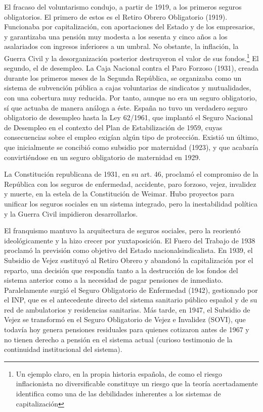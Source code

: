 \documentclass[10pt,a4paper]{article}
\begin{document}
El fracaso del voluntarismo condujo, a partir de 1919, a los primeros seguros obligatorios. El primero de estos es el Retiro Obrero Obligatorio (1919). Funcionaba por capitalización, con aportaciones del Estado y de los empresarios, y garantizaba una pensión muy modesta a los sesenta y cinco años a los asalariados con ingresos inferiores a un umbral. No obstante, la inflación, la Guerra Civil y la desorganización posterior destruyeron el valor de sus fondos.\footnote{
Un ejemplo claro, en la propia historia española, de como el riesgo inflacionista no diversificable constituye un riesgo que la teoría acertadamente identifica como una de las debilidades inherentes a los sistemas de capitalización
} El segundo, el de desempleo. La Caja Nacional contra el Paro Forzoso (1931), creada durante los primeros meses de la Segunda República, se organizaba como un sistema de subvención pública a cajas voluntarias de sindicatos y mutualidades, con una cobertura muy reducida. Por tanto, aunque no era un seguro obligatorio, sí que actuaba de manera análoga a éste. España no tuvo un verdadero seguro obligatorio de desempleo hasta la Ley 62/1961, que implantó el Seguro Nacional de Desempleo en el contexto del Plan de Estabilización de 1959, cuyas consecuencias sobre el empleo exigían algún tipo de protección. Existió un último, que inicialmente se concibió como subsidio por maternidad (1923), y que acabaría convirtiéndose en un seguro obligatorio de maternidad en 1929.

La Constitución republicana de 1931, en su art. 46, proclamó el compromiso de la República con los seguros de enfermedad, accidente, paro forzoso, vejez, invalidez y muerte, en la estela de la Constitución de Weimar. Hubo proyectos para unificar los seguros sociales en un sistema integrado, pero la inestabilidad política y la Guerra Civil impidieron desarrollarlos.

El franquismo mantuvo la arquitectura de seguros sociales, pero la reorientó ideológicamente y la hizo crecer por yuxtaposición. El Fuero del Trabajo de 1938 proclamó la previsión como objetivo del Estado nacionalsindicalista. En 1939, el Subsidio de Vejez sustituyó al Retiro Obrero y abandonó la capitalización por el reparto, una decisión que respondía tanto a la destrucción de los fondos del sistema anterior como a la necesidad de pagar pensiones de inmediato. Paralelamente surgió el Seguro Obligatorio de Enfermedad (1942), gestionado por el INP, que es el antecedente directo del sistema sanitario público español y de su red de ambulatorios y residencias sanitarias. Más tarde, en 1947, el Subsidio de Vejez se transformó en el Seguro Obligatorio de Vejez e Invalidez (SOVI), que todavía hoy genera pensiones residuales para quienes cotizaron antes de 1967 y no tienen derecho a pensión en el sistema actual (curioso testimonio de la continuidad institucional del sistema).
\end{document}
